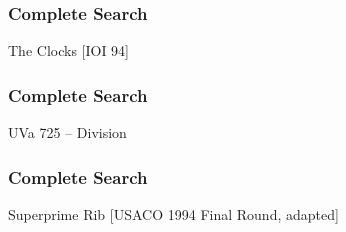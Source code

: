 \begin{frame}
\frametitle{Complete Search}
\begin{block}{The Clocks [IOI 94]}
%
%
%
%
\end{block}
\end{frame}

\begin{frame}
\frametitle{Complete Search}
\begin{block}{UVa 725 -- Division}
\end{block}
\end{frame}

\begin{frame}
\frametitle{Complete Search}
\begin{block}{Superprime Rib [USACO 1994 Final Round, adapted]}
%
%
\end{block}
\end{frame}

